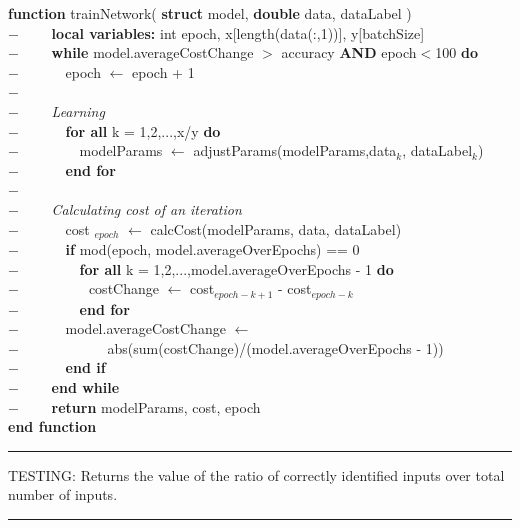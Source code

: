 \begin{addmargin}[2em]{0em}
\textbf{function} trainNetwork( \textbf{struct} model, \textbf{double} data, dataLabel )\\
    $- \qquad$ \textbf{local variables:} int epoch, x[length(data(:,1))], y[batchSize]\\
    $- \qquad $ \textbf{while} model.averageCostChange $>$ accuracy \textbf{AND} epoch$<$100 \textbf{do}\\
    $- \qquad \quad$ epoch $\leftarrow$ epoch + 1\\
    $- \qquad $\\
    $- \qquad $ \textit{Learning}\\
    $- \qquad \quad$ \textbf{for all} k = 1,2,...,x/y \textbf{do}\\
    $- \qquad \quad \quad  $ modelParams $\leftarrow$ adjustParams(modelParams,data$_k$, dataLabel$_k$) \\ 
    $- \qquad \quad $ \textbf{end for}\\
    $- \qquad $\\
    $- \qquad $ \textit{Calculating cost of an iteration}\\
    $- \qquad \quad $ cost $_{epoch}$
    $\leftarrow$ calcCost(modelParams, data, dataLabel)\\
    $- \qquad \quad$ \textbf{if} mod(epoch, model.averageOverEpochs) == 0\\
    $- \qquad \quad \quad$ \textbf{for all} k = 1,2,...,model.averageOverEpochs - 1 \textbf{do}\\
    $- \qquad \quad \quad \quad $costChange $\leftarrow$ cost$_{epoch-k+1}$ - cost$_{epoch-k}$\\
    $- \qquad \quad \quad$ \textbf{end for}\\
    $- \qquad \quad$ model.averageCostChange $\leftarrow$\\
    $- \qquad \quad \quad \quad \quad$ abs(sum(costChange)/(model.averageOverEpochs - 1))\\
    $- \qquad \quad$ \textbf{end if}\\
    $- \qquad$ \textbf{end while}\\
    $- \qquad$ \textbf{return} modelParams, cost, epoch\\
\textbf{end function}\\
\end{addmargin}
\rule{\textwidth}{0.4pt}
 TESTING: Returns the value of the ratio of correctly identified inputs over total number of inputs.\\
\rule{\textwidth}{0.4pt}
